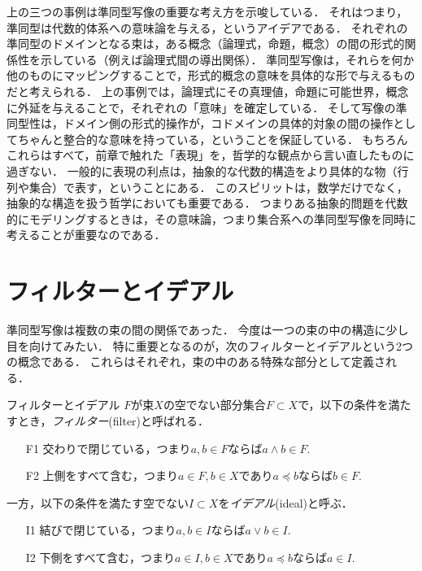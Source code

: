 \documentclass[11pt,a4paper, dvipdfmx]{jsarticle}
\begin{document}
上の三つの事例は準同型写像の重要な考え方を示唆している．
それはつまり，準同型は代数的体系への意味論を与える，というアイデアである．
それぞれの準同型のドメインとなる束は，ある概念（論理式，命題，概念）の間の形式的関係性を示している（例えば論理式間の導出関係）．
準同型写像は，それらを何か他のものにマッピングすることで，形式的概念の意味を具体的な形で与えるものだと考えられる．
上の事例では，論理式にその真理値，命題に可能世界，概念に外延を与えることで，それぞれの「意味」を確定している．
そして写像の準同型性は，ドメイン側の形式的操作が，コドメインの具体的対象の間の操作としてちゃんと整合的な意味を持っている，ということを保証している．
もちろんこれらはすべて，前章で触れた「表現」を，哲学的な観点から言い直したものに過ぎない．
一般的に表現の利点は，抽象的な代数的構造をより具体的な物（行列や集合）で表す，ということにある．
このスピリットは，数学だけでなく，抽象的な構造を扱う哲学においても重要である．
つまりある抽象的問題を代数的にモデリングするときは，その意味論，つまり集合系への準同型写像を同時に考えることが重要なのである．



\section{フィルターとイデアル}
準同型写像は複数の束の間の関係であった．
今度は一つの束の中の構造に少し目を向けてみたい．
特に重要となるのが，次のフィルターとイデアルという2つの概念である．
これらはそれぞれ，束の中のある特殊な部分として定義される．
\begin{itembox}[l]{フィルターとイデアル}
$F$が束$X$の空でない部分集合$F \subset X$で，以下の条件を満たすとき，\emph{フィルター}(filter)と呼ばれる．
\begin{enumerate}
    \item[F1] 交わりで閉じている，つまり$a, b \in F$ならば$a \wedge b \in F$.
    \item[F2] 上側をすべて含む，つまり$a \in F, b \in X$であり$a \preceq b$ならば$b \in F$.
\end{enumerate}
一方，以下の条件を満たす空でない$I \subset X$を\emph{イデアル}(ideal)と呼ぶ．
\begin{enumerate}
    \item[I1] 結びで閉じている，つまり$a, b \in I$ならば$a \vee b \in I$.
    \item[I2] 下側をすべて含む，つまり$a \in I, b \in X$であり$a \preceq b$ならば$a \in I$.
\end{enumerate}
\end{itembox}
\end{document}
